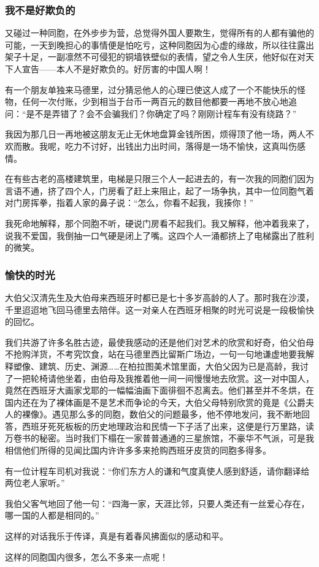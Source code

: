 \subsubsection*{我不是好欺负的}
\par 又碰过一种同胞，在外步步为营，总觉得外国人要欺生，觉得所有的人都有骗他的可能，一天到晚担心的事情便是怕吃亏，这种同胞因为心虚的缘故，所以往往露出架子十足，一副凛然不可侵犯的铜墙铁壁似的表情，望之令人生厌，他好似在对天下人宣告——本人不是好欺负的。好厉害的中国人啊！
\par 有一个朋友单独来马德里，过分猜忌他人的心理已使这人成了一个不能快乐的怪物，任何一次付账，少到相当于台币一两百元的数目他都要一再地不放心地追问：“是不是弄错了？会不会骗我们？你确定了吗？刚刚计程车有没有绕路？”
\par 我因为那几日一再地被这朋友无止无休地盘算金钱所困，烦得顶了他一场，两人不欢而散。我呢，吃力不讨好，出钱出力出时间，落得是一场不愉快，这真叫伤感情。
\par 在有些古老的高楼建筑里，电梯是只限三个人一起进去的，有一次我的同胞们因为言语不通，挤了四个人，门房看了赶上来阻止，起了一场争执，其中一位同胞气着对门房挥拳，指着人家的鼻子说：“怎么，你看不起我，我揍你！”
\par 我死命地解释，那个同胞不听，硬说门房看不起我们。我又解释，他冲着我来了，说我不爱国，我倒抽一口气硬是闭上了嘴。这四个人一涌都挤上了电梯露出了胜利的微笑。
\subsubsection*{愉快的时光}
\par 大伯父汉清先生及大伯母来西班牙时都已是七十多岁高龄的人了。那时我在沙漠，千里迢迢地飞回马德里去陪伴。这一对亲人在西班牙相聚的时光可说是一段极愉快的回忆。
\par 我们共游了许多名胜古迹，最使我感动的还是他们对艺术的欣赏和好奇，伯父伯母不抢购洋货，不考究饮食，站在马德里西比留斯广场边，一句一句地谦虚地要我解释塑像、建筑、历史、渊源……在柏拉图美术馆里面，大伯父因为已是高龄，我讨了一把轮椅请他坐着，由伯母及我推着他一间一间慢慢地去欣赏。这一对中国人，竟然在西班牙大画家戈耶的一幅幅油画下面徘徊不忍离去。他们甚至并不冬烘，在国内还在为了裸体画是不是艺术而争论的今天，大伯父母特别欣赏的竟是《公爵夫人的裸像》。遇见那么多的同胞，数伯父的问题最多，他不停地发问，我不断地回答，西班牙死死板板的历史地理政治和民情一下子活了出来，这便是行万里路，读万卷书的秘密。当时我们下榻在一家普普通通的三星旅馆，不豪华不气派，可是我相信他们所得的见闻比国内许许多多来抢购西班牙皮货的同胞多得多。
\par 有一位计程车司机对我说：“你们东方人的谦和气度真使人感到舒适，请你翻译给两位老人家听。”
\par 我伯父客气地回了他一句：“四海一家，天涯比邻，只要人类还有一丝爱心存在，哪一国的人都是相同的。”
\par 这样的对话我乐于传译，真是有着春风拂面似的感动和平。
\par 这样的同胞国内很多，怎么不多来一点呢！
